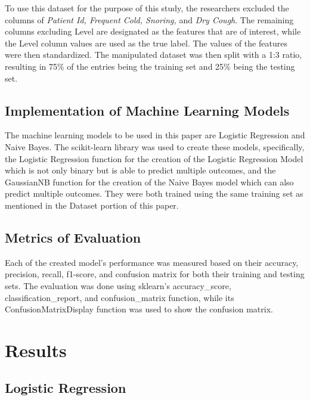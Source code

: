 \documentclass[runningheads]{llncs}
\begin{document}
To use this dataset for the purpose of this study, the researchers excluded the columns of \textit{Patient Id, Frequent Cold, Snoring,} and \textit{Dry Cough}. The remaining columns excluding Level are designated as the features that are of interest, while the Level column values are used as the true label. The values of the features were then standardized. The manipulated dataset was then split with a 1:3 ratio, resulting in 75\% of the entries being the training set and 25\% being the testing set. 

\subsection{Implementation of Machine Learning Models}
The machine learning models to be used in this paper are Logistic Regression and Naive Bayes. The scikit-learn library was used to create these models, specifically, the Logistic Regression function for the creation of the Logistic Regression Model which is not only binary but is able to predict multiple outcomes, and the GaussianNB function for the creation of the Naive Bayes model which can also predict multiple outcomes. They were both trained using the same training set as mentioned in the Dataset portion of this paper.

\subsection{Metrics of Evaluation}
Each of the created model’s performance was measured based on their accuracy, precision, recall, f1-score, and confusion matrix for both their training and testing sets. The evaluation was done using sklearn’s accuracy\_score, classification\_report, and confusion\_matrix function, while its ConfusionMatrixDisplay function was used to show the confusion matrix.

\section{Results}

\subsection{Logistic Regression}
\end{document}
